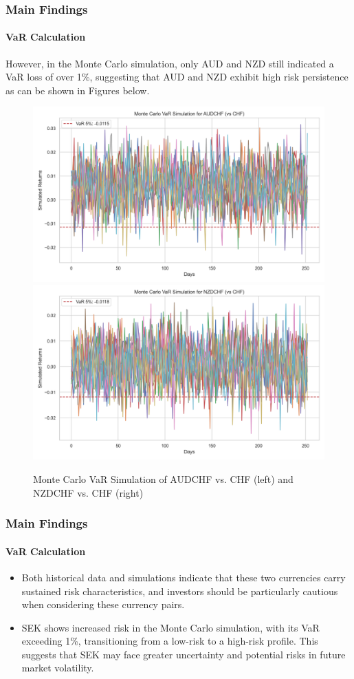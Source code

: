 \documentclass[10pt]{beamer}
\begin{document}
\begin{frame}
\frametitle{Main Findings}
\framesubtitle{VaR Calculation}
However, in the Monte Carlo simulation, only AUD and NZD still indicated a VaR loss of over 1\%, suggesting that AUD and NZD exhibit high risk persistence as can be shown in Figures below.

\begin{figure}[h]
    \centering   
    \includegraphics[width=0.48\linewidth]{reports/figures/monte_carlo_var_simulation_AUDCHF_vs_CHF.png}  \label{fig:monte_carlo_var_simulation_AUDCHF_vs_CHF}
    \includegraphics[width=0.48\linewidth]{reports/figures/monte_carlo_var_simulation_NZDCHF_vs_CHF.png}   \label{fig:monte_carlo_var_simulation_NZDCHF_vs_CHF}
    \caption{\footnotesize Monte Carlo VaR Simulation of AUDCHF vs. CHF (left) and NZDCHF vs. CHF (right)}  
\end{figure}
\end{frame}
\begin{frame}
\frametitle{Main Findings}
\framesubtitle{VaR Calculation}
\begin{itemize}
    \item Both historical data and simulations indicate that these two currencies carry sustained risk characteristics, and investors should be particularly cautious when considering these currency pairs.
    \item SEK shows increased risk in
    the Monte Carlo simulation, with its VaR exceeding 1\%, transitioning from a low-risk to a high-risk profile. This suggests that SEK may face greater uncertainty and potential risks in future market volatility.
\end{itemize}
\end{frame}
\end{document}
